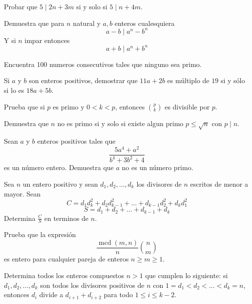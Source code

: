\documentclass[11pt]{scrartcl}
\newcommand{\mcd}{\operatorname{mcd}}
\begin{document}
\begin{problem}
Probar que $5 \mid 2n+3m$ si y solo si $5 \mid n+4m$.
\end{problem}
\begin{problem}
Demuestra que para $n$ natural y $a,b$ enteros cualesquiera \[ a-b \mid a^n-b^n \]
Y si $n$ impar entonces \[a+b \mid a^n+b^n\]
\end{problem}

\begin{problem}
	Encuentra 100 numeros consecutivos tales que ninguno sea primo.
\end{problem}
\begin{problem} %

    Si $a$ y $b$ son enteros positivos, demostrar que $11a+2b$ es múltiplo de $19$ si y sólo si lo es $18a+5b$.
\end{problem}

\begin{problem}
Prueba que si $p$ es primo y $0<k<p$, entonces $\binom{p}{k}$ es divisible por $p$.
\end{problem}

\begin{problem}
Demuestra que $n$ no es primo si y solo si existe algun primo $p \leq  \sqrt{n}$ con $p \mid n$.
\end{problem}

\begin{problem} %

    Sean $a$ y $b$ enteros positivos tales que 
\[\frac{5a^4+a^2}{b^4+3b^2+4}\]
es un número entero. Demuestra que $a$ no es un número primo.
    	
\end{problem}

\begin{problem}
Sea $n$ un entero positivo y sean $d_1, d_2, \ldots, d_k$ los divisores de $n$ escritos de menor a mayor. Sean 
\[C = d_1d_k^2+d_2d_{k-1}^2+\ldots+d_{k-1}d_2^2+d_kd_1^2\]
\[S= d_1+d_2+\ldots+d_{k-1}+d_k\]
Determina $\frac{C}{S}$ en terminos de $n$.
\end{problem}


\begin{problem} %

Prueba que la expresi\'on 
\[\frac{\mcd (m,n)}{n} \binom{n}{m}\]
es entero para cualquier pareja de enteros $n \geq m \geq 1$.
\end{problem}


\begin{problem} %
Determina todos los enteros compuestos $n > 1$ que cumplen lo siguiente: si $d_1, d_2, \ldots, d_k$ son todos los divisores positivos de $n$ con $1=d_1 < d_2 <\ldots <d_k=n$, entonces $d_i$ divide a $d_{i+1}+d_{i+2}$ para todo $1 \leq i \leq k-2$.
\end{problem}
\end{document}
